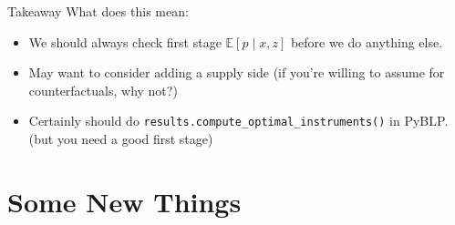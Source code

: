 \documentclass[aspectratio=169,10pt]{beamer}
\begin{document}





\begin{frame}{Takeaway}
What does this mean:
\begin{itemize}
    \item We should always check \alert{first stage} $\mathbb{E}[p \mid x, z]$ before we do anything else.
    \item May want to consider adding a supply side (if you're willing to assume for counterfactuals, why not?)
    \item Certainly should do \texttt{results.compute\_optimal\_instruments()} in PyBLP. (but you need a good first stage)
\end{itemize}
\end{frame}


\section{Some New Things}
\end{document}
